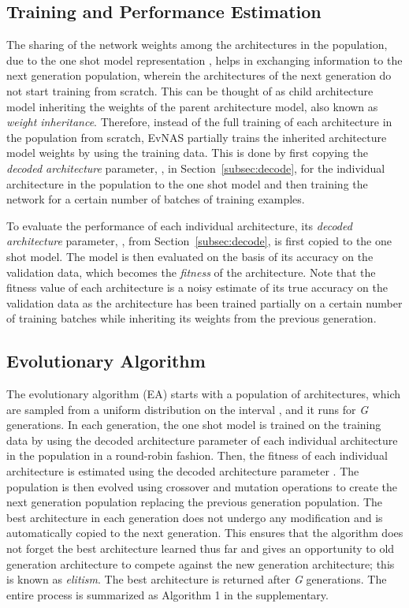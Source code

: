 \documentclass[final]{cvpr}
\begin{document}
\subsection{Training and Performance Estimation}
The sharing of the network weights among the architectures in the population, due to the one shot
model representation \cite{liu2018darts2}, helps in exchanging information to the next generation
population, wherein the architectures of the next generation do not start training from scratch.
This can be thought of as child architecture model inheriting the weights of the parent
architecture model, also known as \textit{weight inheritance}. Therefore, instead of the full
training of each architecture in the population from scratch, EvNAS partially trains the inherited
architecture model weights by using the training data. This is done by first copying the
\textit{decoded architecture} parameter, , in Section~\ref{subsec:decode}, for the
individual architecture in the population to the one shot model and then training the network for
a certain number of batches of training examples. 

To evaluate the performance of each individual architecture, its \textit{decoded architecture}
parameter, , from Section~\ref{subsec:decode}, is first copied to the one shot 
model. The model is then evaluated on the basis of its accuracy on the validation data, 
which becomes the \textit{fitness} of the architecture. Note that the fitness value of each
architecture is a noisy estimate of its true accuracy on the validation data as the architecture
has been trained partially on a certain number of training batches while inheriting its weights
from the previous generation.

\subsection{Evolutionary Algorithm}
The evolutionary algorithm (EA) starts with a population of architectures, which are sampled
from a uniform distribution on the interval , and it runs for \textit{G}
generations. In each generation, the one shot model is trained on the training data by using the
decoded architecture parameter  of each individual architecture in the population in
a round-robin fashion. Then, the fitness of each individual architecture is estimated using the
decoded architecture parameter . The population is then evolved using crossover and
mutation operations to create the next generation population replacing the previous generation
population. The best architecture in each generation does not undergo any modification and is
automatically copied to the next generation. This ensures that the algorithm does not forget the
best architecture learned thus far and gives an opportunity to old generation architecture to
compete against the new generation architecture; this is known as \textit{elitism}. The best
architecture is returned after \textit{G} generations. The entire process is summarized as
Algorithm 1 in the supplementary.
\end{document}

